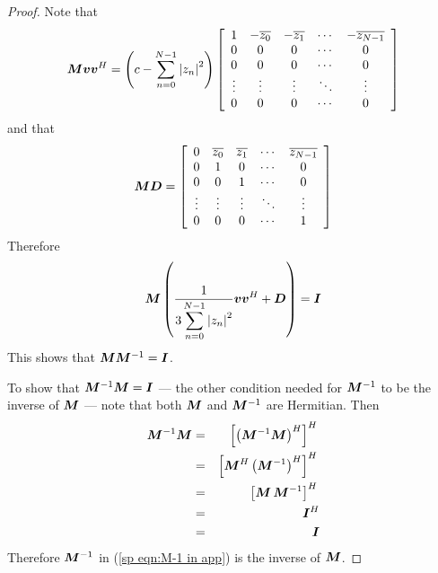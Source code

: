 \begin{proof}
Note that 
\begin{equation}
\bm{M}\bm{v}\bm{v}^H=
\left(c-\sum_{n=0}^{N-1}\left|z_n\right|^2\right)
\left[\begin{array}{ccccc} 
1	&-\overline{z_0}	&-\overline{z_1}	&\cdots	&-\overline{z_{N-1}}\\
0	&0	&0	&\cdots	&0	\\
0	&0	&0	&\cdots	&0	\\
\vdots	&\vdots	&\vdots	&\ddots	&\vdots	\\
0	&0	&0	&\cdots	&0	
\end{array}\right]
\end{equation}
and that
\begin{equation}
\bm{M}\bm{D}=
\left[\begin{array}{ccccc} 
0	&\overline{z_0}	&\overline{z_1}	&\cdots	&\overline{z_{N-1}}\\
0	&1	&0	&\cdots	&0	\\
0	&0	&1	&\cdots	&0	\\
\vdots	&\vdots	&\vdots	&\ddots	&\vdots	\\
0	&0	&0	&\cdots	&1	
\end{array}\right]
\end{equation}
Therefore
\begin{equation}
\bm{M}\left(
\frac{1}{3\displaystyle\sum_{n=0}^{N-1}\left|z_n\right|^2}\bm{v}\bm{v}^H+\bm{D}
\right)=\bm{I}
\end{equation}
This shows that $\bm{M}\bm{M}^{-1}=\bm{I}$.

To show that $\bm{M}^{-1}\bm{M}=\bm{I}$ --- the other condition 
needed for $\bm{M}^{-1}$ to be the inverse of $\bm{M}$ --- note that 
both $\bm{M}$ and $\bm{M}^{-1}$ are 
Hermitian. Then
\begin{eqnarray}
\bm{M}^{-1}\bm{M}
&=&\left[\left(\bm{M}^{-1}\bm{M}\right)^H\right]^H		{\nonumber}\\
&=&\left[\bm{M}^H\left(\bm{M}^{-1}\right)^H\right]^{H}	{\nonumber}\\
&=&\left[\bm{M}\,\bm{M}^{-1}\right]^{H}			{\nonumber}\\
&=&\bm{I}^H							{\nonumber}\\
&=&\bm{I}
\end{eqnarray}
Therefore $\bm{M}^{-1}$ in (\ref{sp eqn:M-1 in app}) is the inverse of 
$\bm{M}$.
\end{proof}

